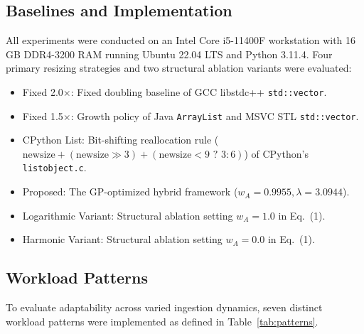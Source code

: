 \documentclass[conference]{IEEEtran}
\begin{document}
\subsection{Baselines and Implementation}
All experiments were conducted on an Intel Core i5-11400F workstation with 16 GB DDR4-3200 RAM running Ubuntu 22.04 LTS and Python 3.11.4. Four primary resizing strategies and two structural ablation variants were evaluated:
\begin{itemize}
    \item Fixed 2.0$\times$: Fixed doubling baseline of GCC libstdc++ \texttt{std::vector}.
    \item Fixed 1.5$\times$: Growth policy of Java \texttt{ArrayList} and MSVC STL \texttt{std::vector}.
    \item CPython List: Bit-shifting reallocation rule ($\text{newsize} + (\text{newsize} \gg 3) + (\text{newsize} < 9 \,\,?\,\, 3 : 6)$) of CPython's \texttt{listobject.c}.
    \item Proposed: The GP-optimized hybrid framework ($w_A = 0.9955, \lambda = 3.0944$).
    \item Logarithmic Variant: Structural ablation setting $w_A = 1.0$ in Eq.~(1).
    \item Harmonic Variant: Structural ablation setting $w_A = 0.0$ in Eq.~(1).
\end{itemize}

\subsection{Workload Patterns}
To evaluate adaptability across varied ingestion dynamics, seven distinct workload patterns were implemented as defined in Table~\ref{tab:patterns}.

\begin{table}[htbp]
\caption{Workload Patterns and Ingestion Behaviors}
\label{tab:patterns}
\begin{center}
\end{center}
\end{table}
\end{document}
